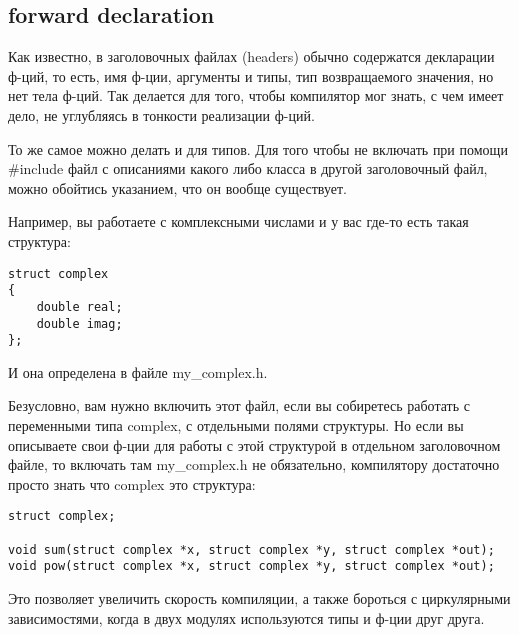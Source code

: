 ﻿\label{forwarddeclaration}
\subsection{forward declaration}

Как известно, в заголовочных файлах (headers) обычно содержатся декларации ф-ций, то есть, 
имя ф-ции, аргументы и типы, тип возвращаемого значения, но нет тела ф-ций. Так делается для того,
чтобы компилятор мог знать, с чем имеет дело, не углубляясь в тонкости реализации ф-ций.

То же самое можно делать и для типов. Для того чтобы не включать при помощи \#include файл с описаниями
какого либо класса в другой заголовочный файл, можно обойтись указанием, что он вообще существует.

Например, вы работаете с комплексными числами и у вас где-то есть такая структура:

\begin{lstlisting}
struct complex
{
	double real;
	double imag;
};
\end{lstlisting}

И она определена в файле my\_complex.h.

Безусловно, вам нужно включить этот файл, если вы собиретесь работать с переменными типа complex, 
с отдельными полями структуры.
Но если вы описываете свои ф-ции для работы с этой структурой в отдельном заголовочном файле, то включать там
my\_complex.h не обязательно, компилятору достаточно просто знать что complex это структура:

\begin{lstlisting}
struct complex;

void sum(struct complex *x, struct complex *y, struct complex *out);
void pow(struct complex *x, struct complex *y, struct complex *out);
\end{lstlisting}

Это позволяет увеличить скорость компиляции, а также бороться с циркулярными зависимостями, когда
в двух модулях используются типы и ф-ции друг друга.
